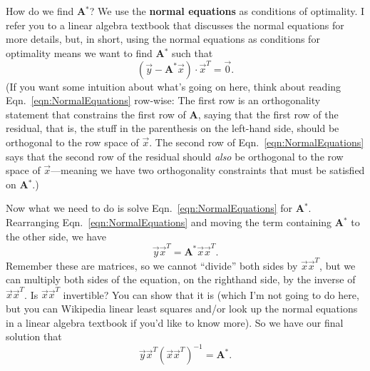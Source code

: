 \documentclass[11pt]{article}
\begin{document}
How do we find {\bf A$^*$}? We use the {\bf normal equations} as conditions of optimality. 
I refer you to a linear algebra textbook that discusses the normal equations for more details, but, in short, using the normal equations as conditions for optimality means we want to find {\bf A$^*$} such that
\begin{equation}
(\vec{y}-\mathbf{A^*}\vec{x})\cdot\vec{x}^T = \vec{0}. \label{eqn:NormalEquations}
\end{equation}
(If you want some intuition about what's going on here, think about reading Eqn.~\ref{eqn:NormalEquations} row-wise: The first row is an orthogonality statement that constrains the first row of {\bf A}, saying that the first row of the residual, that is, the stuff in the parenthesis on the left-hand side, should be orthogonal to the row space of $\vec{x}$. The second row of Eqn.~\ref{eqn:NormalEquations} says that the second row of the residual should {\it also} be orthogonal to the row space of $\vec{x}$---meaning we have two orthogonality constraints that must be satisfied on {\bf A$^*$}.)

Now what we need to do is solve Eqn.~\eqref{eqn:NormalEquations} for {\bf A$^*$}. Rearranging Eqn.~\eqref{eqn:NormalEquations} and moving the term containing {\bf A$^*$} to the other side, we have
\begin{equation}
\vec{y}\vec{x}^T = \mathbf{A^*}\vec{x}\vec{x}^T.
\end{equation}
Remember these are matrices, so we cannot ``divide'' both sides by $\vec{x}\vec{x}^T$, but we can multiply both sides of the equation, on the righthand side, by the inverse of $\vec{x}\vec{x}^T$. Is $\vec{x}\vec{x}^T$ invertible? You can show that it is (which I'm not going to do here, but you can Wikipedia linear least squares and/or look up the normal equations in a linear algebra textbook if you'd like to know more).  So we have our final solution that 
\begin{equation}
\vec{y}\vec{x}^T(\vec{x}\vec{x}^T)^{-1} = \mathbf{A^*}. \label{eqn:NormEqnsSolution}
\end{equation}
\end{document}
